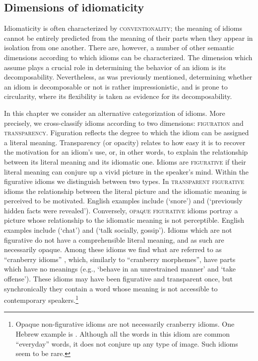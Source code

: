 \documentclass[output=paper]{langsci/langscibook}
\begin{document}
\subsection{Dimensions of idiomaticity}
\label{sec:semantic-class}
Idiomaticity is often characterized by {\scshape conventionality}; the meaning of idioms cannot be entirely predicted from the meaning of their parts when they appear in isolation from one another. There are, however, a number of other semantic dimensions according to which idioms can be characterized. The dimension which \citet[p. 498]{nunberg94} assume plays a crucial role in determining the behavior of an idiom is its decomposability. Nevertheless, as was previously mentioned, determining whether an idiom is decomposable or not is rather impressionistic, and is prone to circularity, where its flexibility is taken as evidence for its decomposability.

In this chapter we consider an alternative categorization of idioms. More precisely, we cross-classify idioms according to two dimensions: {\scshape figuration} and {\scshape transparency}. Figuration reflects the degree to which the idiom can be assigned a literal meaning. Transparency (or opacity) relates to how easy it is to recover the motivation for an idiom's use, or, in other words, to explain the relationship between its literal meaning and its idiomatic one. Idioms are {\scshape figurative} if their literal meaning can conjure up a vivid picture in the speaker's mind. Within the figurative idioms we distinguish between two types. In {\scshape transparent figurative} idioms the relationship between the literal picture and the idiomatic meaning is perceived to be motivated. English examples include  (`snore') and  (`previously hidden facts were revealed'). Conversely, {\scshape opaque figurative} idioms portray a picture whose relationship to the idiomatic meaning is not perceptible. English examples include  (`chat') and  (`talk socially, gossip'). Idioms which are not figurative do not have a comprehensible literal meaning, and as such are necessarily opaque. Among these idioms we find what are referred to as ``cranberry idioms'' \citep{moon98,trawinskisailersoehnetal.2008}, which, similarly to ``cranberry morphemes'', have parts which have no meanings (e.g.,  `behave in an unrestrained manner' and  `take offense'). These idioms may have been figurative and transparent once, but synchronically they contain a word whose meaning is not accessible to contemporary speakers.\footnote{Opaque non-figurative idioms are not necessarily cranberry idioms. One Hebrew example is . Although all the words in this idiom are common ``everyday'' words, it does not conjure up any type of image. Such idioms seem to be rare.}
\end{document}
